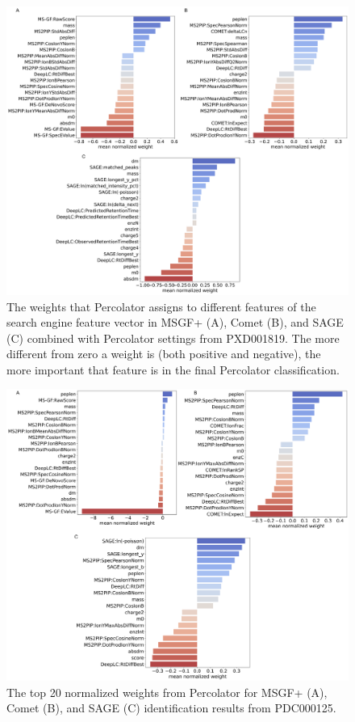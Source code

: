 \documentclass[12pt]{article}
\begin{document}
\begin{figure}[ht!]
	\centering
	\includegraphics[width=1\textwidth]{figures//LFQ_weights.png}
	\caption{The weights that Percolator assigns to different features of the search engine feature vector in MSGF+ (A), Comet (B), and SAGE (C) combined with Percolator settings from PXD001819. The more different from zero a weight is (both positive and negative), the more important that feature is in the final Percolator classification.}
	\label{fig:PXD001819_svm_weights}
\end{figure}

\begin{figure}[ht!]
	\centering
	\includegraphics[width=1\textwidth]{figures//CPTAC_weights.png}
	\caption{The top 20 normalized weights from Percolator for MSGF+ (A), Comet (B), and SAGE (C) identification results from PDC000125.}
	\label{fig:PDC_ms2rescore_weights}
\end{figure}
\end{document}
